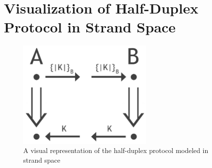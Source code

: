 \section{Visualization of Half-Duplex Protocol in Strand Space}
	\label{sec:appendixHalfDuplex}

	\begin{figure}[h]
		\centering
		\includegraphics[width=0.6\textwidth]{half-duplex.png}
		\caption{
			A visual representation of the half-duplex protocol modeled in strand space
			\label{fig:half-duplex}
		}
	\end{figure}

